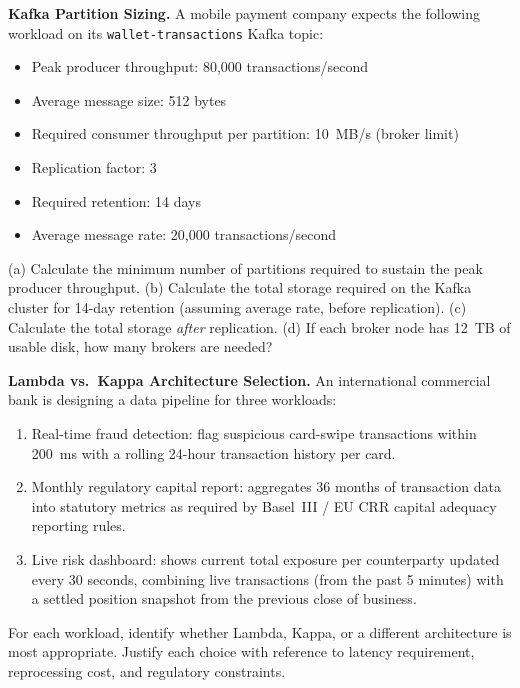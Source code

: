 \ap \textbf{Kafka Partition Sizing.}
A mobile payment company expects the following workload
on its \texttt{wallet-transactions} Kafka topic:
\begin{itemize}
  \item Peak producer throughput: 80{,}000 transactions/second
  \item Average message size: 512 bytes
  \item Required consumer throughput per partition: 10~MB/s (broker limit)
  \item Replication factor: 3
  \item Required retention: 14 days
  \item Average message rate: 20{,}000 transactions/second
\end{itemize}
(a) Calculate the minimum number of partitions required to sustain the
peak producer throughput. (b) Calculate the total storage required on the
Kafka cluster for 14-day retention (assuming average rate, before replication).
(c) Calculate the total storage \emph{after} replication. (d) If each
broker node has 12~TB of usable disk, how many brokers are needed?

\ap \textbf{Lambda vs.\ Kappa Architecture Selection.}
An international commercial bank is designing a data pipeline for three
workloads:
\begin{enumerate}
  \item Real-time fraud detection: flag suspicious card-swipe transactions
        within 200~ms with a rolling 24-hour transaction history per card.
  \item Monthly regulatory capital report: aggregates 36 months of
        transaction data into statutory metrics as required by
        Basel~III / EU CRR capital adequacy reporting rules.
  \item Live risk dashboard: shows current total exposure per counterparty
        updated every 30 seconds, combining live transactions (from the
        past 5 minutes) with a settled position snapshot from the previous
        close of business.
\end{enumerate}
For each workload, identify whether Lambda, Kappa, or a different
architecture is most appropriate. Justify each choice with reference
to latency requirement, reprocessing cost, and regulatory constraints.

